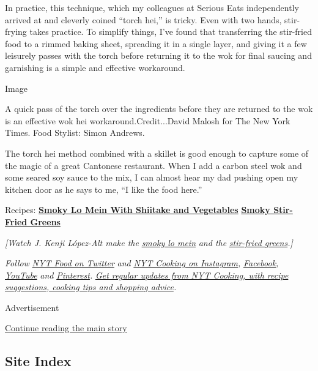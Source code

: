 In practice, this technique, which my colleagues at Serious Eats
independently arrived at and cleverly coined ``torch hei,'' is tricky.
Even with two hands, stir-frying takes practice. To simplify things,
I've found that transferring the stir-fried food to a rimmed baking
sheet, spreading it in a single layer, and giving it a few leisurely
passes with the torch before returning it to the wok for final saucing
and garnishing is a simple and effective workaround.

Image

A quick pass of the torch over the ingredients before they are returned
to the wok is an effective wok hei workaround.Credit...David Malosh for
The New York Times. Food Stylist: Simon Andrews.

The torch hei method combined with a skillet is good enough to capture
some of the magic of a great Cantonese restaurant. When I add a carbon
steel wok and some seared soy sauce to the mix, I can almost hear my dad
pushing open my kitchen door as he says to me, ``I like the food here.''

Recipes:
\textbf{\href{https://cooking.nytimes3xbfgragh.onion/recipes/1021379-smoky-lo-mein-with-shiitake-and-vegetables}{Smoky
Lo Mein With Shiitake and Vegetables}} \textbar{}
\textbf{\href{https://cooking.nytimes3xbfgragh.onion/recipes/1021378-smoky-stir-fried-greens}{Smoky
Stir-Fried Greens}}

\emph{{[}Watch J. Kenji López-Alt make the}
\href{https://youtu.be/iac_idcz6XE}{\emph{smoky lo mein}} \emph{and the}
\href{https://youtu.be/hcGRskPjQcU}{\emph{stir-fried greens}}\emph{.{]}}

\emph{Follow} \href{https://twitter.com/nytfood}{\emph{NYT Food on
Twitter}} \emph{and}
\href{https://www.instagram.com/nytcooking/}{\emph{NYT Cooking on
Instagram}}\emph{,}
\href{https://www.facebookcorewwwi.onion/nytcooking/}{\emph{Facebook}}\emph{,}
\href{https://www.youtube.com/nytcooking}{\emph{YouTube}} \emph{and}
\href{https://www.pinterest.com/nytcooking/}{\emph{Pinterest}}\emph{.}
\href{https://www.nytimes3xbfgragh.onion/newsletters/cooking}{\emph{Get
regular updates from NYT Cooking, with recipe suggestions, cooking tips
and shopping advice}}\emph{.}

Advertisement

\protect\hyperlink{after-bottom}{Continue reading the main story}

\hypertarget{site-index}{%
\subsection{Site Index}\label{site-index}}

